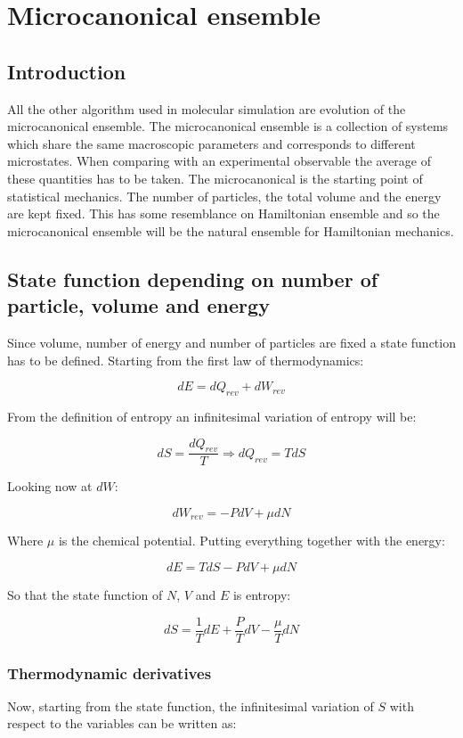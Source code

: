 \chapter{Microcanonical ensemble}

\section{Introduction}
All the other algorithm used in molecular simulation are evolution of the microcanonical ensemble.
The microcanonical ensemble is a collection of systems which share the same macroscopic parameters and corresponds to different microstates.
When comparing with an experimental observable the average of these quantities has to be taken.
The microcanonical is the starting point of statistical mechanics.
The number of particles, the total volume and the energy are kept fixed.
This has some resemblance on Hamiltonian ensemble and so the microcanonical ensemble will be the natural ensemble for Hamiltonian mechanics.

\section{State function depending on number of particle, volume and energy}
Since volume, number of energy and number of particles are fixed a state function has to be defined.
Starting from the first law of thermodynamics:

$$dE = dQ_{rev} + dW_{rev}$$

From the definition of entropy an infinitesimal variation of entropy will be:

$$dS = \frac{dQ_{rev}}{T}\Rightarrow dQ_{rev} = TdS$$

Looking now at $dW$:

$$dW_{rev} = -PdV + \mu dN$$

Where $\mu$ is the chemical potential.
Putting everything together with the energy:

$$dE = TdS - PdV + \mu dN$$

So that the state function of $N$, $V$ and $E$ is entropy:

$$dS = \frac{1}{T}dE + \frac{P}{T}dV - \frac{\mu}{T}dN$$

	\subsection{Thermodynamic derivatives}
	Now, starting from the state function, the infinitesimal variation of $S$ with respect to the variables can be written as:

